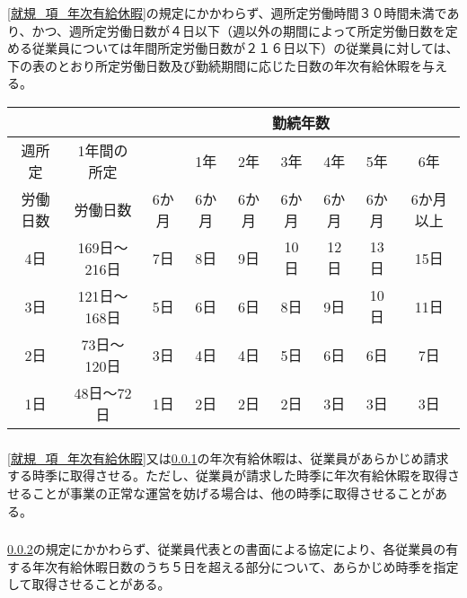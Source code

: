 \documentclass{jsarticle}
\begin{document}
\subsubsection{}
\label{就規_項_年次有給休暇の比例付与}
\ref{就規_項_年次有給休暇}の規定にかかわらず、週所定労働時間３０時間未満であり、かつ、週所定労働日数が４日以下（週以外の期間によって所定労働日数を定める従業員については年間所定労働日数が２１６日以下）の従業員に対しては、下の表のとおり所定労働日数及び勤続期間に応じた日数の年次有給休暇を与える。
  \begin{table}[htb]
    \centering
    \begin{tabular}{|c|c|c|c|c|c|c|c|c|} \hline
      \multicolumn{2}{|l|}{} & \multicolumn{7}{|c|}{勤続年数} \\ \hline
      週所定 & 1年間の所定 &  & 1年 & 2年 & 3年 & 4年 & 5年 & 6年 \\ 
      労働日数 & 労働日数 &  6か月 & 6か月 & 6か月 & 6か月 & 6か月 & 6か月 & 6か月以上 \\ \hline \hline
      4日 & 169日～216日 & 7日 & 8日 & 9日 & 10日 & 12日 & 13日 & 15日 \\ \hline
      3日 & 121日～168日 & 5日 & 6日 & 6日 & 8日 & 9日 & 10日 & 11日 \\ \hline
      2日 & 73日～120日 & 3日 & 4日 & 4日 & 5日 & 6日 & 6日 & 7日 \\ \hline
      1日 & 48日～72日 & 1日 & 2日 & 2日 & 2日 & 3日 & 3日 & 3日 \\ \hline
    \end{tabular}
  \end{table}
\subsubsection{}
\label{就規_項_年次有給休暇の時季指定}
\ref{就規_項_年次有給休暇}又は\ref{就規_項_年次有給休暇の比例付与}の年次有給休暇は、従業員があらかじめ請求する時季に取得させる。ただし、従業員が請求した時季に年次有給休暇を取得させることが事業の正常な運営を妨げる場合は、他の時季に取得させることがある。
\subsubsection{}
\label{就規_項_年次有給休暇の計画的付与}
\ref{就規_項_年次有給休暇の時季指定}の規定にかかわらず、従業員代表との書面による協定により、各従業員の有する年次有給休暇日数のうち５日を超える部分について、あらかじめ時季を指定して取得させることがある。
\end{document}
